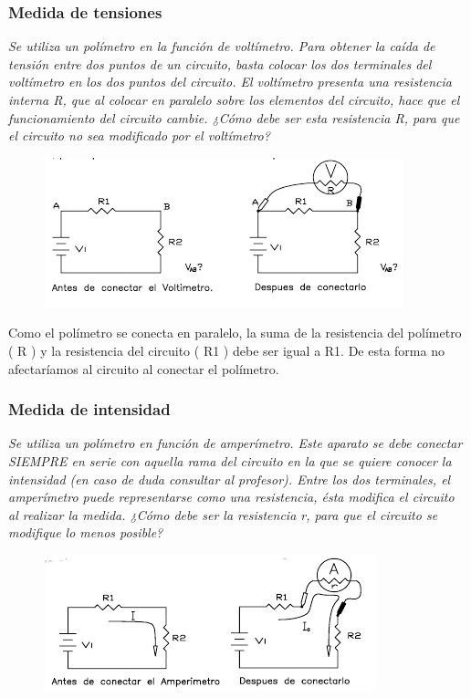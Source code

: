 \documentclass[paper=a4, fontsize=11pt]{scrartcl} %
\numberwithin{equation}{section} %
\numberwithin{figure}{section} %
\numberwithin{table}{section} %
\begin{document}
\subsubsection{Medida de tensiones} 

\textit{Se utiliza un polímetro en la función de voltímetro. Para obtener la caída de tensión entre dos puntos de un circuito, basta colocar los dos terminales del voltímetro en los dos puntos del circuito. El voltímetro presenta una resistencia interna R, que al colocar en paralelo sobre los elementos del circuito, hace que el funcionamiento del circuito cambie. \newline
¿Cómo debe ser esta resistencia R, para que el circuito no sea modificado por el voltímetro?} 

\begin{figure}[H]
	\centering
	\includegraphics{image/medida-tension}
\end{figure}

Como el polímetro se conecta en paralelo, la suma de la resistencia del polímetro ( R ) y la resistencia del circuito ( R1 ) debe ser igual a R1. De esta forma no afectaríamos al circuito al conectar  el polímetro.

\subsubsection{Medida de intensidad} 

\textit{Se utiliza un polímetro en función de amperímetro. Este aparato se debe conectar SIEMPRE en serie con aquella rama del circuito en la que se quiere conocer la intensidad (en caso de duda consultar al profesor). Entre los dos terminales, el amperímetro puede representarse como una resistencia, ésta modifica el circuito al realizar la medida.
	¿Cómo debe ser la resistencia r, para que el circuito se modifique lo menos posible?}

\begin{figure}[h]
	\centering
	\includegraphics{image/medida-intensidad1}
\end{figure}
\end{document}
